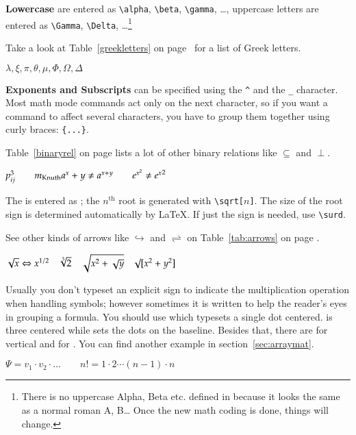 \textbf{Lowercase } are entered as \verb|\alpha|,
 \verb|\beta|, \verb|\gamma|, \ldots, uppercase letters
are entered as \verb|\Gamma|, \verb|\Delta|, \ldots\footnote{There is no
  uppercase Alpha, Beta etc. defined in \LaTeXe{} because it looks the same as a 
  normal roman A, B\ldots{} Once the new math coding is done, things will
  change.} 

Take a look at Table~\ref{greekletters} on page~\pageref{greekletters} for a
list of Greek letters.
\begin{example}
$\lambda,\xi,\pi,\theta,
 \mu,\Phi,\Omega,\Delta$
\end{example}


\textbf{Exponents and Subscripts} can be specified using
the \verb|^| and the \verb|_| character.
Most math mode commands act only on the next character, so if you
want a command to affect several characters, you have to group them
together using curly braces: \verb|{...}|.

Table~\ref{binaryrel} on page \pageref{binaryrel} lists a lot of other binary
relations like $\subseteq$ and $\perp$.

\begin{example}
$p^3_{ij} \qquad
 m_\text{Knuth} \\[5pt]
 a^x+y \neq a^{x+y}\qquad 
 e^{x^2} \neq {e^x}^2$
\end{example}


The \textbf{} is entered as ; the
$n^\text{th}$ root is generated with \verb|\sqrt[|$n$\verb|]|. The size of
the root sign is determined automatically by \LaTeX. If just the sign
is needed, use \verb|\surd|.

See other kinds of arrows like $\hookrightarrow$ and $\rightleftharpoons$ on
Table~\ref{tab:arrows} on page \pageref{tab:arrows}. 
\begin{example}
$\sqrt{x} \Leftrightarrow x^{1/2}
 \quad \sqrt[3]{2}
 \quad \sqrt{x^{2} + \sqrt{y}}
 \quad \surd[x^2 + y^2]$
\end{example}


Usually you don't typeset an explicit \textbf{} sign to indicate
the multiplication operation when handling symbols; however sometimes it is written
to help the reader's eyes in grouping a formula.
You should use  which typesets a single dot centered.  is
three centered \textbf{} while  sets the dots on the
baseline. Besides that, there are  for 
vertical and  for . You can find another example in
section~\ref{sec:arraymat}.
\begin{example}
$\Psi = v_1 \cdot v_2
 \cdot \ldots \qquad 
 n! = 1 \cdot 2 
 \cdots (n-1) \cdot n$
\end{example}

